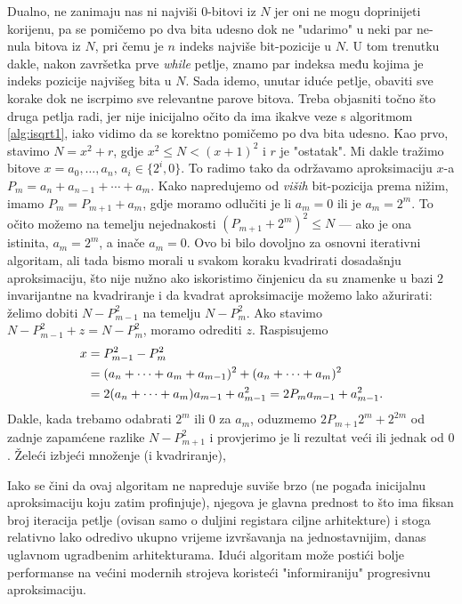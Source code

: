\documentclass[12pt]{scrartcl}
\begin{document}
Dualno, ne zanimaju nas ni najviši $0$-bitovi iz $N$ jer oni ne mogu doprinijeti korijenu, pa se pomičemo po dva bita udesno dok ne "udarimo" u neki 
par ne-nula bitova iz $N$, pri čemu je $n$ indeks najviše bit-pozicije u $N$. U tom trenutku dakle, nakon završetka prve \textsl{while} petlje,
znamo par indeksa među kojima je indeks pozicije najvišeg bita u $N$. Sada idemo, unutar iduće petlje, obaviti sve korake dok ne iscrpimo
sve relevantne parove bitova. Treba objasniti točno što druga petlja radi, jer nije inicijalno očito da ima ikakve veze s algoritmom \ref{alg:isqrt1},
iako vidimo da se korektno pomičemo po dva bita udesno. Kao prvo, stavimo $N=x^2+r$, gdje $x^2\leq N < (x+1)^2$ i $r$ je "ostatak".
Mi dakle tražimo bitove $x=a_0,\dotsc ,a_n,\,a_i\in\{2^i,0\}$. To radimo tako da održavamo aproksimaciju $x$-a $P_m=a_n+a_{n-1}+\dotsb+a_m$.
Kako napredujemo od \emph{viših} bit-pozicija prema nižim, imamo $P_m=P_{m+1}+a_m$, gdje moramo odlučiti je li $a_m=0$ ili je $a_m=2^m$.
To očito možemo na temelju nejednakosti $(P_{m+1}+2^m)^2 \leq N$ --- ako je ona istinita, $a_m=2^m$, a inače $a_m=0$. Ovo bi bilo dovoljno za
osnovni iterativni algoritam, ali tada bismo morali u svakom koraku kvadrirati dosadašnju aproksimaciju, što nije nužno ako iskoristimo činjenicu
da su znamenke u bazi $2$ invarijantne na kvadriranje i da kvadrat aproksimacije možemo lako ažurirati: želimo dobiti $N-P^2_{m-1}$ na temelju
$N-P^2_m$. Ako stavimo $N-P^2_{m-1}+z=N-P^2_m$, moramo odrediti $z$. Raspisujemo
\begin{align}
    x&=P^2_{m-1}-P^2_m\\
    &=(a_n+\dotsb+a_m+a_{m-1})^2+(a_n+\dotsb+a_m)^2\\
    &=2(a_n+\dotsb+a_m)a_{m-1}+a^2_{m-1}=2P_ma_{m-1}+a^2_{m-1}\text.
\end{align}
Dakle, kada trebamo odabrati $2^m$ ili $0$ za $a_m$, oduzmemo $2P_{m+1}2^m+2^{2m}$ od zadnje zapamćene razlike $N-P^2_{m+1}$ i provjerimo je li rezultat
veći ili jednak od $0$. Želeći izbjeći množenje (i kvadriranje), 

Iako se čini da ovaj algoritam ne napreduje suviše brzo (ne pogađa inicijalnu aproksimaciju koju zatim profinjuje), njegova je
glavna prednost to što ima fiksan broj iteracija petlje
(ovisan samo o duljini registara ciljne arhitekture) i stoga relativno lako odredivo ukupno
vrijeme izvršavanja na jednostavnijim, danas uglavnom ugradbenim arhitekturama. Idući algoritam može postići bolje performanse na većini
modernih strojeva koristeći "informiraniju" progresivnu aproksimaciju.
\end{document}
